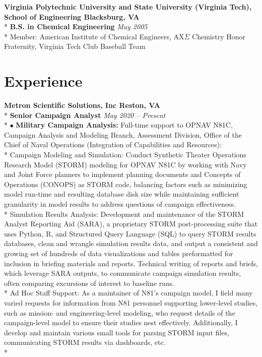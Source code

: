 \documentclass{article}
\begin{document}
\noindent \textbf{Virginia Polytechnic University and State University (Virginia Tech), School of Engineering \hfill Blacksburg, VA} \\*
\textbf{B.S. in Chemical Engineering} \hfill \textit{May 2005} \\*
\textendash Member: American Institute of Chemical Engineers, AX$\Sigma$ Chemistry Honor Fraternity, Virginia Tech Club Baseball Team 

\section{Experience}

\noindent \textbf{Metron Scientific Solutions, Inc \hfill Reston, VA} \\*
\textbf{Senior Campaign Analyst} \hfill \textit{May 2020 -- Present} \\*
$\bullet$ \textbf{Military Campaign Analysis:} Full-time support to OPNAV N81C, Campaign Analysis and Modeling Branch, Assessment Division, Office of the Chief of Naval Operations (Integration of Capabilities and Resources):\\*
\indent \textendash Campaign Modeling and Simulation: Conduct Synthetic Theater Operations Research Model (STORM) modeling for OPNAV N81C by working with Navy and Joint Force planners to implement planning documents and Concepts of Operations (CONOPS) as STORM code, balancing factors such as minimizing model run-time and resulting database disk size while maintaining sufficient granularity in model results to address questions of campaign effectiveness.\\*
\indent \textendash Simulation Results Analysis: Development and maintenance of the STORM Analyst Reporting Aid (SARA), a proprietary STORM post-processing suite that uses Python, R, and Structured Query Language (SQL) to query STORM results databases, clean and wrangle simulation results data, and output a consistent and growing set of hundreds of data visualizations and tables preformatted for inclusion in briefing materials and reports. Technical writing of reports and briefs, which leverage SARA outputs, to communicate campaign simulation results, often comparing excursions of interest to baseline runs. \\*
\indent \textendash Ad Hoc Staff Support: As a maintainer of N81's campaign model, I field many varied requests for information from N81 personnel supporting lower-level studies, such as mission- and engineering-level modeling, who request details of the campaign-level model to ensure their studies nest effectively. Additionally, I develop and maintain various small tools for parsing STORM input files, communicating STORM results via dashboards, etc. \\*
\end{document}
